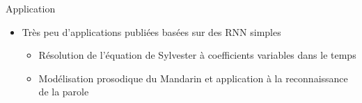 \begin{frame}{Application}
	\begin{itemize}
	\item Très peu d'applications publiées basées sur des RNN simples
		\begin{itemize}
			\item Résolution de l'équation de Sylvester à coefficients variables dans le temps \cite{Zhang02}
			\item Modélisation prosodique du Mandarin et application à la reconnaissance de la parole \cite{Wang02}
		\end{itemize}
	\end{itemize}	

\end{frame}
